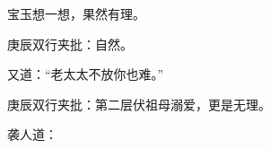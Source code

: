 \begin{parag}


    宝玉想一想，果然有理。\begin{note}庚辰双行夹批：自然。\end{note}又道：“老太太不放你也难。”\begin{note}庚辰双行夹批：第二层伏祖母溺爱，更是无理。\end{note}袭人道：
\end{parag}
